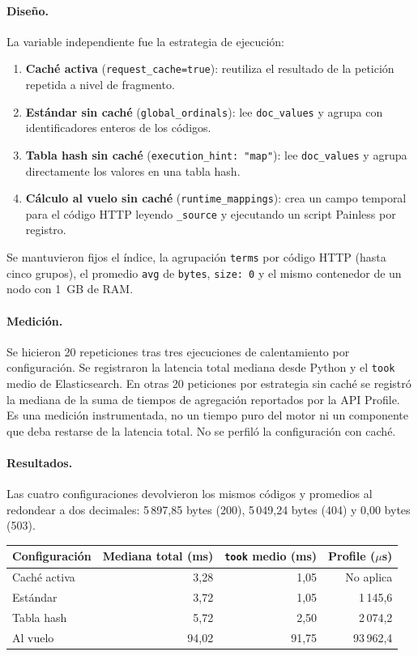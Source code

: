 \documentclass[11pt,a4paper]{article}
\newcommand{\codigo}[1]{\texttt{#1}}
\begin{document}
\paragraph{Diseño.}
La variable independiente fue la estrategia de ejecución:
\begin{enumerate}
\item \textbf{Caché activa} (\codigo{request\_cache=true}): reutiliza el
resultado de la petición repetida a nivel de fragmento.
\item \textbf{Estándar sin caché} (\codigo{global\_ordinals}): lee
\codigo{doc\_values} y agrupa con identificadores enteros de los códigos.
\item \textbf{Tabla hash sin caché} (\codigo{execution\_hint: "map"}): lee
\codigo{doc\_values} y agrupa directamente los valores en una tabla hash.
\item \textbf{Cálculo al vuelo sin caché} (\codigo{runtime\_mappings}):
crea un campo temporal para el código HTTP leyendo \codigo{\_source}
y ejecutando un script Painless por registro.
\end{enumerate}
Se mantuvieron fijos el índice, la agrupación \codigo{terms} por código HTTP
(hasta cinco grupos), el promedio \codigo{avg} de \codigo{bytes},
\codigo{size: 0} y el mismo contenedor de un nodo con 1~GB de RAM.

\paragraph{Medición.}
Se hicieron 20 repeticiones tras tres ejecuciones de calentamiento por
configuración. Se registraron la latencia total mediana desde Python y el
\codigo{took} medio de Elasticsearch. En otras 20 peticiones por estrategia
sin caché se registró la mediana de la suma de tiempos de agregación
reportados por la API Profile. Es una medición instrumentada, no un tiempo
puro del motor ni un componente que deba restarse de la latencia total.
No se perfiló la configuración con caché.

\paragraph{Resultados.}
Las cuatro configuraciones devolvieron los mismos códigos y promedios al
redondear a dos decimales: 5\,897,85 bytes (200), 5\,049,24 bytes (404)
y 0,00 bytes (503).
\begin{center}
\begin{tabular}{lrrr}
\toprule
Configuración & Mediana total (ms) & \codigo{took} medio (ms) & Profile ($\mu$s)\\
\midrule
Caché activa  & 3,28  & 1,05  & No aplica\\
Estándar      & 3,72  & 1,05  & 1\,145,6\\
Tabla hash    & 5,72  & 2,50  & 2\,074,2\\
Al vuelo      & 94,02 & 91,75 & 93\,962,4\\
\bottomrule
\end{tabular}
\end{center}
\end{document}
